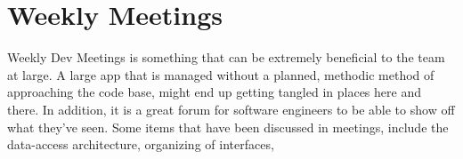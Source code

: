 \section{ Weekly Meetings }
\maketitle{}

Weekly Dev Meetings is something that can be extremely beneficial to the team
at large. A large app that is managed without a planned, methodic method of
approaching the code base, might end up getting tangled in places here and
there. In addition, it is a great forum for software engineers to be able to
show off what they've seen. Some items that have been discussed in meetings,
include the data-access architecture, organizing of interfaces, 
